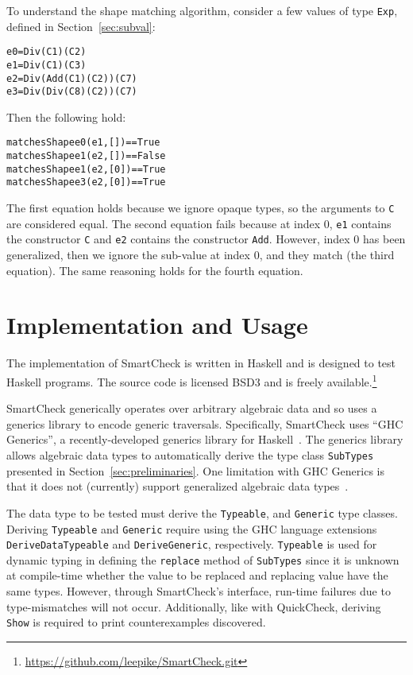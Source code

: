 \documentclass{sigplanconf}
\newenvironment{code}{\begin{alltt}\footnotesize}{\end{alltt}}
\newcommand{\ttp}[1]{\texttt{#1}}
\begin{document}
To understand the shape matching algorithm, consider a few values of type
\ttp{Exp}, defined in Section~\ref{sec:subval}:
%
\begin{code}
e0 = Div (C 1) (C 2)
e1 = Div (C 1) (C 3)
e2 = Div (Add (C 1) (C 2)) (C 7)
e3 = Div (Div (C 8) (C 2)) (C 7)
\end{code}
%
\noindent
Then the following hold:
%
\begin{code}
matchesShape e0 (e1, [])  == True
matchesShape e1 (e2, [])  == False
matchesShape e1 (e2, [0]) == True
matchesShape e3 (e2, [0]) == True
\end{code}
%
The first equation holds because we ignore opaque types, so the arguments to
\ttp{C} are considered equal.  The second equation fails because at index 0,
\ttp{e1} contains the constructor \ttp{C} and \ttp{e2} contains the constructor
\ttp{Add}.  However, index 0 has been generalized, then we ignore the sub-value
at index 0, and they match (the third equation).  The same reasoning holds for
the fourth equation.


\section{Implementation and Usage}\label{sec:implementation}

The implementation of SmartCheck is written in Haskell and is designed to test
Haskell programs.  The source code is licensed BSD3 and is freely
available.\footnote{\url{https://github.com/leepike/SmartCheck.git}}

SmartCheck generically operates over arbitrary algebraic data and so uses a
generics library to encode generic traversals.  Specifically, SmartCheck uses
``GHC Generics'', a recently-developed generics library for
Haskell~\cite{generics}.  The generics library allows algebraic data types to
automatically derive the type class \ttp{SubTypes} presented in
Section~\ref{sec:preliminaries}.  One limitation with GHC Generics is that it
does not (currently) support generalized algebraic data types~\cite{gadts}.

The data type to be tested must derive the \ttp{Typeable}, and \ttp{Generic}
type classes.  Deriving \ttp{Typeable} and \ttp{Generic} require using the GHC
language extensions \ttp{DeriveDataTypeable} and \ttp{DeriveGeneric},
respectively.  \ttp{Typeable} is used for dynamic typing in defining the
\ttp{replace} method of \ttp{SubTypes} since it is unknown at compile-time
whether the value to be replaced and replacing value have the same types.
However, through SmartCheck's interface, run-time failures due to
type-mismatches will not occur.  Additionally, like with QuickCheck, deriving
\ttp{Show} is required to print counterexamples discovered.
\end{document}
